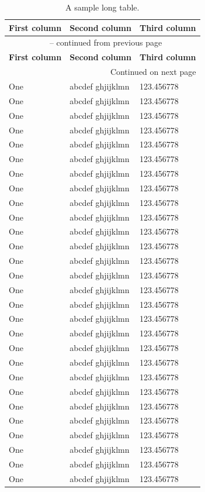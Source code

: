 \documentclass[11pt,twoside,openright]{report}
\begin{document}
\begin{longtable}{|l|l|l|}
 \caption{A sample long table.} 
 \label{tab:TableLong} \\

 \hline 
 \textbf{First column} & \textbf{Second column} & \textbf{Third column} \\ 
 \hline 
 \endfirsthead
 
 \multicolumn{3}{c}{{\tablename\ \thetable{} -- continued from previous page}} \\
 \hline 
 \textbf{First column} & \textbf{Second column} & \textbf{Third column} \\ 
 \hline 
 \endhead


 \hline \multicolumn{3}{|r|}{{Continued on next page}} \\ \hline
 \endfoot

 \hline \hline
 \endlastfoot

One & abcdef ghjijklmn & 123.456778 \\
One & abcdef ghjijklmn & 123.456778 \\
One & abcdef ghjijklmn & 123.456778 \\
One & abcdef ghjijklmn & 123.456778 \\
One & abcdef ghjijklmn & 123.456778 \\
One & abcdef ghjijklmn & 123.456778 \\
One & abcdef ghjijklmn & 123.456778 \\
One & abcdef ghjijklmn & 123.456778 \\
One & abcdef ghjijklmn & 123.456778 \\
One & abcdef ghjijklmn & 123.456778 \\
One & abcdef ghjijklmn & 123.456778 \\
One & abcdef ghjijklmn & 123.456778 \\
One & abcdef ghjijklmn & 123.456778 \\
One & abcdef ghjijklmn & 123.456778 \\
One & abcdef ghjijklmn & 123.456778 \\
One & abcdef ghjijklmn & 123.456778 \\
One & abcdef ghjijklmn & 123.456778 \\
One & abcdef ghjijklmn & 123.456778 \\
One & abcdef ghjijklmn & 123.456778 \\
One & abcdef ghjijklmn & 123.456778 \\
One & abcdef ghjijklmn & 123.456778 \\
One & abcdef ghjijklmn & 123.456778 \\
One & abcdef ghjijklmn & 123.456778 \\
One & abcdef ghjijklmn & 123.456778 \\
One & abcdef ghjijklmn & 123.456778 \\
One & abcdef ghjijklmn & 123.456778 \\
One & abcdef ghjijklmn & 123.456778 \\
One & abcdef ghjijklmn & 123.456778 \\
\end{longtable}
\end{document}
